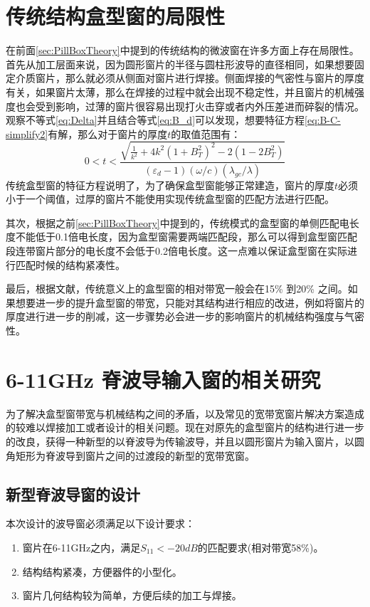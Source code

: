 \documentclass[master]{thesis-uestc}
\begin{document}
\section{传统结构盒型窗的局限性}
在前面\ref{sec:PillBoxTheory}中提到的传统结构的微波窗在许多方面上存在局限性。首先从加工层面来说，因为圆形窗片的半径与圆柱形波导的直径相同，如果想要固定介质窗片，那么就必须从侧面对窗片进行焊接。侧面焊接的气密性与窗片的厚度有关，如果窗片太薄，那么在焊接的过程中就会出现不稳定性，并且窗片的机械强度也会受到影响，过薄的窗片很容易出现打火击穿或者内外压差进而碎裂的情况。观察不等式\ref{eq:Delta}并且结合等式\ref{eq:B_d}可以发现，想要特征方程\ref{eq:B-C-simplify2}有解，那么对于窗片的厚度$t$的取值范围有：
\begin{equation}\label{eq:t_constraints}
    0 < t < \frac{\sqrt{\frac{1}{k^2}+4k^2(1+B_{T}^2)^2-2(1-2B_{T}^2)}}{(\varepsilon_{d}-1)(\omega / c)(\lambda_{gc} / \lambda)}
\end{equation}
传统盒型窗的特征方程说明了，为了确保盒型窗能够正常建造，窗片的厚度$t$必须小于一个阈值，过厚的窗片不能使用实现传统盒型窗的匹配方法进行匹配。

其次，根据之前\ref{sec:PillBoxTheory}中提到的，传统模式的盒型窗的单侧匹配电长度不能低于0.1倍电长度，因为盒型窗需要两端匹配段，那么可以得到盒型窗匹配段连带窗片部分的电长度不会低于0.2倍电长度。这一点难以保证盒型窗在实际进行匹配时候的结构紧凑性。

最后，根据文献\cite{huxiongli_bandwidth_pill}，传统意义上的盒型窗的相对带宽一般会在15\% 到20\% 之间。如果想要进一步的提升盒型窗的带宽，只能对其结构进行相应的改进，例如将窗片的厚度进行进一步的削减，这一步骤势必会进一步的影响窗片的机械结构强度与气密性。

\section{6-11GHz 脊波导输入窗的相关研究}
为了解决盒型窗带宽与机械结构之间的矛盾，以及常见的宽带宽窗片解决方案造成的较难以焊接加工或者设计的相关问题。现在对原先的盒型窗片的结构进行进一步的改良，获得一种新型的以脊波导为传输波导，并且以圆形窗片为输入窗片，以圆角矩形为脊波导到窗片之间的过渡段的新型的宽带宽窗。
\subsection{新型脊波导窗的设计}
本次设计的波导窗必须满足以下设计要求：
\begin{enumerate}
    \item 窗片在6-11GHz之内，满足$S_{11}<-20dB$的匹配要求(相对带宽58\%)。
    \item 结构结构紧凑，方便器件的小型化。
    \item 窗片几何结构较为简单，方便后续的加工与焊接。
\end{enumerate}
\end{document}
